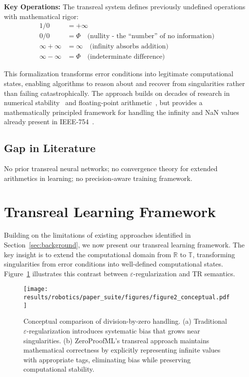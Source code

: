 \documentclass[twoside,11pt]{article}
\newcommand{\TR}{\mathbb{T}}
\newcommand{\RR}{\mathbb{R}}
\begin{document}
\textbf{Key Operations:}
The transreal system defines previously undefined operations with mathematical rigor:
\begin{align}
1/0 &= +\infty \\
0/0 &= \Phi \quad \text{(nullity - the ``number'' of no information)} \\
\infty + \infty &= \infty \quad \text{(infinity absorbs addition)} \\
\infty - \infty &= \Phi \quad \text{(indeterminate difference)}
\end{align}

This formalization transforms error conditions into legitimate computational states, enabling algorithms to reason about and recover from singularities rather than failing catastrophically. The approach builds on decades of research in numerical stability~\citep{higham2002accuracy} and floating-point arithmetic~\citep{goldberg1991every,ieee754-2019}, but provides a mathematically principled framework for handling the infinity and NaN values already present in IEEE-754~\citep{kahan1996ieee}.
\subsection{Gap in Literature}
No prior transreal neural networks; no convergence theory for extended arithmetics in learning; no precision-aware training framework.

\section{Transreal Learning Framework}
\label{sec:framework}
Building on the limitations of existing approaches identified in Section~\ref{sec:background}, we now present our transreal learning framework. The key insight is to extend the computational domain from $\RR$ to $\TR$, transforming singularities from error conditions into well-defined computational states. Figure~\ref{fig:conceptual} illustrates this contrast between $\varepsilon$-regularization and TR semantics.

\begin{figure}[t]
\centering
\texttt{[image: results/robotics/paper\_suite/figures/figure2\_conceptual.pdf]}
\caption{Conceptual comparison of division-by-zero handling. (a) Traditional $\varepsilon$-regularization introduces systematic bias that grows near singularities. (b) ZeroProofML's transreal approach maintains mathematical correctness by explicitly representing infinite values with appropriate tags, eliminating bias while preserving computational stability.}
\label{fig:conceptual}
\end{figure}
\end{document}
